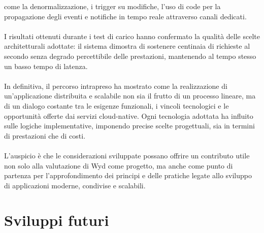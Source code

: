 come la denormalizzazione, i trigger su modifiche, 
l'uso di code per la propagazione degli eventi e 
notifiche in tempo reale attraverso canali dedicati.\\
\\
I risultati ottenuti durante i test di carico hanno confermato 
la qualità delle scelte architetturali adottate: 
il sistema dimostra di sostenere centinaia di richieste al secondo 
senza degrado percettibile delle prestazioni, 
mantenendo al tempo stesso un basso tempo di latenza.\\
\\
In definitiva, il percorso intrapreso ha mostrato 
come la realizzazione di un'applicazione distribuita e scalabile 
non sia il frutto di un processo lineare, 
ma di un dialogo costante tra le esigenze funzionali, 
i vincoli tecnologici e le opportunità offerte dai servizi cloud-native. 
Ogni tecnologia adottata ha influito sulle logiche implementative, 
imponendo precise scelte progettuali, 
sia in termini di prestazioni che di costi.\\
\\
L'auspicio è che le considerazioni sviluppate 
possano offrire un contributo utile non solo alla valutazione di Wyd come progetto,
ma anche come punto di partenza per l'approfondimento dei principi e delle pratiche 
legate allo sviluppo di applicazioni moderne, condivise e scalabili.
\clearpage

\section{Sviluppi futuri}

